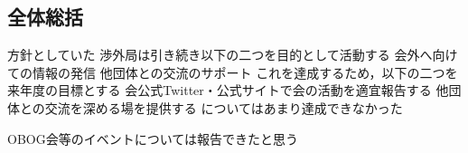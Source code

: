 \subsection*{全体総括}


方針としていた
        渉外局は引き続き以下の二つを目的として活動する
        会外へ向けての情報の発信
        他団体との交流のサポート
    これを達成するため，以下の二つを来年度の目標とする
        会公式Twitter・公式サイトで会の活動を適宜報告する
        他団体との交流を深める場を提供する
についてはあまり達成できなかった

OBOG会等のイベントについては報告できたと思う

